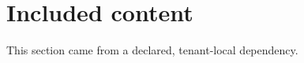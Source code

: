 \section{Included content}\label{sec:included}
This section came from a declared, tenant-local dependency.
